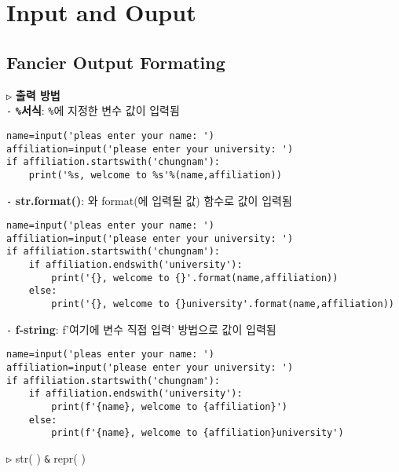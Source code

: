 \documentclass[11pt,a4paper]{article}
\begin{document}
\section{\LARGE\textbf{Input and Ouput}}
\subsection{\Large\textbf{Fancier Output Formating}}
\begin{spacing}{1.5}
\texttt{▷} \textbf{출력 방법}\\
\texttt{-} \textbf{\texttt{\%}서식}: \texttt{\%}에 지정한 변수 값이 입력됨
\begin{lstlisting}[label={list:first},caption=\texttt{\%} format]
name=input('pleas enter your name: ')
affiliation=input('please enter your university: ')
if affiliation.startswith('chungnam'):
    print('%s, welcome to %s'%(name,affiliation))
\end{lstlisting}

\texttt{-} \textbf{str.format()}: {}와 format({}에 입력될 값) 함수로 값이 입력됨
\begin{lstlisting}[label={list:first},caption=str.format()]
name=input('pleas enter your name: ')
affiliation=input('please enter your university: ')
if affiliation.startswith('chungnam'):
    if affiliation.endswith('university'):
        print('{}, welcome to {}'.format(name,affiliation))
    else:
        print('{}, welcome to {}university'.format(name,affiliation))
\end{lstlisting}

\texttt{-} \textbf{f-string}: f'{여기에 변수 직접 입력}' 방법으로 값이 입력됨
\begin{lstlisting}[label={list:first},caption=f-string]
name=input('pleas enter your name: ')
affiliation=input('please enter your university: ')
if affiliation.startswith('chungnam'):
    if affiliation.endswith('university'):
        print(f'{name}, welcome to {affiliation}')
    else:
        print(f'{name}, welcome to {affiliation}university')
\end{lstlisting}

\texttt{▷} str( ) \texttt{\&} repr( )\\


\end{spacing}
\end{document}

